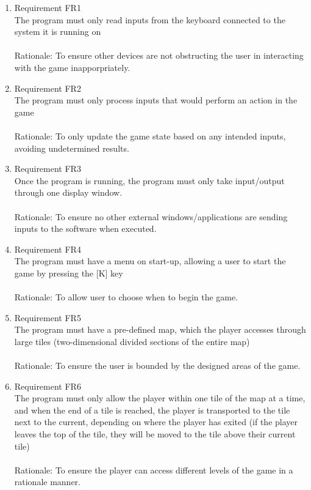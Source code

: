 \documentclass[12pt, titlepage]{article}
\begin{document}
\begin{enumerate}
    \item Requirement FR1\\ The program must only read inputs from the keyboard connected to the system it is running on\\\\
    {\color{blue}Rationale: To ensure other devices are not obstructing the user in interacting with the game inapporpriately.}
    
    \item Requirement FR2\\The program must only process inputs that would perform an action in the game\\\\
    {\color{blue}Rationale: To only update the game state based on any intended inputs, avoiding undetermined results.}
    
    \item Requirement FR3\\Once the program is running, the program must only take input/output through one display window.\\\\
    {\color{blue}Rationale: To ensure no other external windows/applications are sending inputs to the software when executed.}
    
    \item Requirement FR4\\The program must have a menu on start-up, allowing a user to {\color{blue} start the game by pressing the [K] key}\\\\
    {\color{blue}Rationale: To allow user to choose when to begin the game.}
    
    \item Requirement FR5\\The program must have a pre-defined map, which the player accesses through large tiles (two-dimensional divided sections of the entire map)\\\\
    {\color{blue}Rationale: To ensure the user is bounded by the designed areas of the game.}
    
    \item Requirement FR6\\The program must only allow the player within one tile of the map at a time, and when the end of a tile is reached, the player is transported to the tile next to the current, depending on where the player has exited (if the player leaves the top of the tile, they will be moved to the tile above their current tile)\\\\
    {\color{blue}Rationale: To ensure the player can access different levels of the game in a rationale manner.}
    

\end{enumerate}
\end{document}
